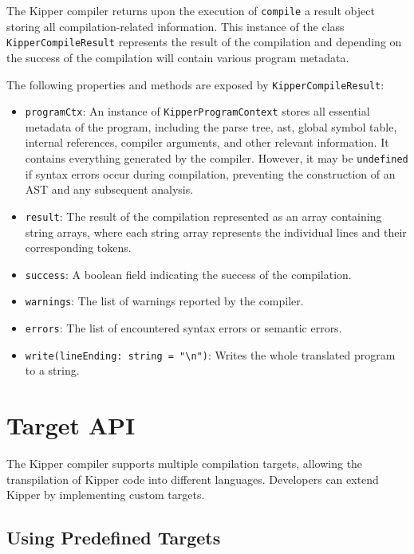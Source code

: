 The Kipper compiler returns upon the execution of \lstinline|compile| a result object storing all compilation-related information. This instance of the class \lstinline|KipperCompileResult| represents the result of the compilation and depending on the success of the compilation will contain various program metadata. 

The following properties and methods are exposed by \lstinline|KipperCompileResult|:

\begin{itemize}
	\item \lstinline|programCtx|: An instance of \lstinline|KipperProgramContext| stores all essential metadata of the program, including the parse tree, \acrshort{ast}, global symbol table, internal references, compiler arguments, and other relevant information. It contains everything generated by the compiler. However, it may be \lstinline|undefined| if syntax errors occur during compilation, preventing the construction of an AST and any subsequent analysis.
	\item \lstinline|result|: The result of the compilation represented as an array containing string arrays, where each string array represents the individual lines and their corresponding tokens.
	\item \lstinline|success|: A boolean field indicating the success of the compilation.
	\item \lstinline|warnings|: The list of warnings reported by the compiler.
	\item \lstinline|errors|: The list of encountered syntax errors or semantic errors.
	\item \lstinline|write(lineEnding: string = "\n")|: Writes the whole translated program to a string.
\end{itemize}

\section{Target API}
\label{sec:target_api}

The Kipper compiler supports multiple compilation targets, allowing the \gls{transpilation} of Kipper code into different languages. Developers can extend Kipper by implementing custom targets.

\subsection{Using Predefined Targets}
\label{subsec:using_targets}

